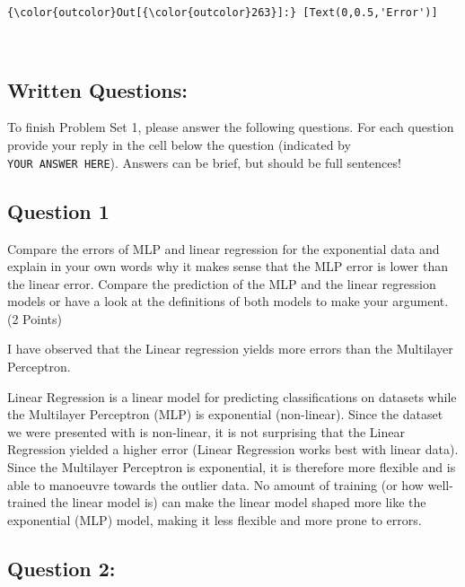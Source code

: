 \documentclass[11pt]{article}
\begin{document}
\begin{Verbatim}[commandchars=\\\{\}]
{\color{outcolor}Out[{\color{outcolor}263}]:} [Text(0,0.5,'Error')]
\end{Verbatim}
            
    \begin{center}
    \end{center}
    { \hspace*{\fill} \\}
    
    \subsection{Written Questions:}\label{written-questions}

To finish Problem Set 1, please answer the following questions. For each
question provide your reply in the cell below the question (indicated by
\texttt{YOUR\ ANSWER\ HERE}). Answers can be brief, but should be full
sentences!

    \subsection{Question 1}\label{question-1}

Compare the errors of MLP and linear regression for the exponential data
and explain in your own words why it makes sense that the MLP error is
lower than the linear error. Compare the prediction of the MLP and the
linear regression models or have a look at the definitions of both
models to make your argument. (2 Points)

    I have observed that the Linear regression yields more errors than the
Multilayer Perceptron.

Linear Regression is a linear model for predicting classifications on
datasets while the Multilayer Perceptron (MLP) is exponential
(non-linear). Since the dataset we were presented with is non-linear, it
is not surprising that the Linear Regression yielded a higher error
(Linear Regression works best with linear data). Since the Multilayer
Perceptron is exponential, it is therefore more flexible and is able to
manoeuvre towards the outlier data. No amount of training (or how
well-trained the linear model is) can make the linear model shaped more
like the exponential (MLP) model, making it less flexible and more prone
to errors.

    \subsection{Question 2:}\label{question-2}
\end{document}
